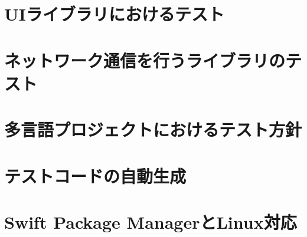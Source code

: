 

\section{UIライブラリにおけるテスト}\label{section:thirdparty_case_ui}


\section{ネットワーク通信を行うライブラリのテスト}\label{section:thirdparty_case_network}


\section{多言語プロジェクトにおけるテスト方針}\label{section:thirdparty_case_multilingualization}


\section{テストコードの自動生成}\label{section:thirdparty_case_autogeneration}


\section{Swift Package ManagerとLinux対応}\label{section:thirdparty_case_spm}


